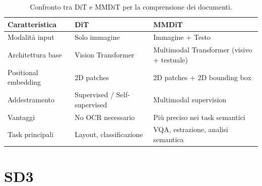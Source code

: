 \begin{table}[htbp]
\centering
\begin{adjustbox}{width=\textwidth}
\begin{tabular}{|l|p{5.5cm}|p{6cm}|}
\hline
\textbf{Caratteristica} & \textbf{DiT} & \textbf{MMDiT} \\
\hline
Modalità input & Solo immagine & Immagine + Testo \\
\hline
Architettura base & Vision Transformer & Multimodal Transformer (visivo + testuale) \\
\hline
Positional embedding & 2D patches & 2D patches + 2D bounding box \\
\hline
Addestramento & Supervised / Self-supervised & Multimodal supervision \\
\hline
Vantaggi & No OCR necessario & Più preciso nei task semantici \\
\hline
Task principali & Layout, classificazione & VQA, estrazione, analisi semantica \\
\hline
\end{tabular}
\end{adjustbox}
\caption{Confronto tra DiT e MMDiT per la comprensione dei documenti.}
\end{table}

\section{SD3}

